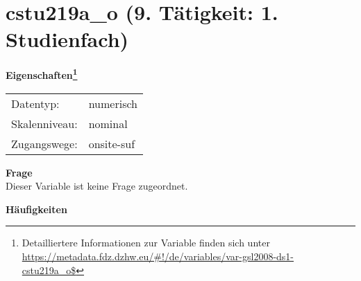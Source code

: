 
    \setcounter{footnote}{0}

    \vspace*{-1.8cm}
	\section{cstu219a\_o (9. Tätigkeit: 1. Studienfach)}
	\label{section:cstu219a_o}



    \vspace*{0.5cm}
    \noindent\textbf{Eigenschaften\footnote{Detailliertere Informationen zur Variable finden sich unter
		\url{https://metadata.fdz.dzhw.eu/\#!/de/variables/var-gsl2008-ds1-cstu219a_o$}}}\\
	\begin{tabularx}{\hsize}{@{}lX}
	Datentyp: & numerisch \\
	Skalenniveau: & nominal \\
	Zugangswege: &
	  onsite-suf
 \\
    \end{tabularx}



		\vspace*{0.5cm}
		\noindent\textbf{Frage}\\
		Dieser Variable ist keine Frage zugeordnet.





        		\vspace*{0.5cm}
                \noindent\textbf{Häufigkeiten}

